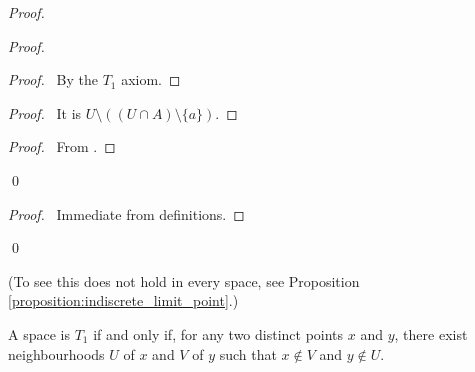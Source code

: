 \begin{proof}
    \pf
    \begin{proof}
        \begin{proof}
            \pf\ By the $T_1$ axiom.
        \end{proof}
        \begin{proof}
            \pf\ It is $U \setminus ((U \cap A) \setminus \{a\})$.
        \end{proof}
        \begin{proof}
            \pf\ From .
        \end{proof}
        \qedstep
        \qed
    \end{proof}
    \begin{proof}
        \pf\ Immediate from definitions.
    \end{proof}
    \qed
\end{proof}

(To see this does not hold in every space, see Proposition \ref{proposition:indiscrete_limit_point}.)

\begin{proposition}
    A space is $T_1$ if and only if, for any two distinct points $x$ and $y$, there exist neighbourhoods
    $U$ of $x$ and $V$ of $y$ such that $x \notin V$ and $y \notin U$.
\end{proposition}

